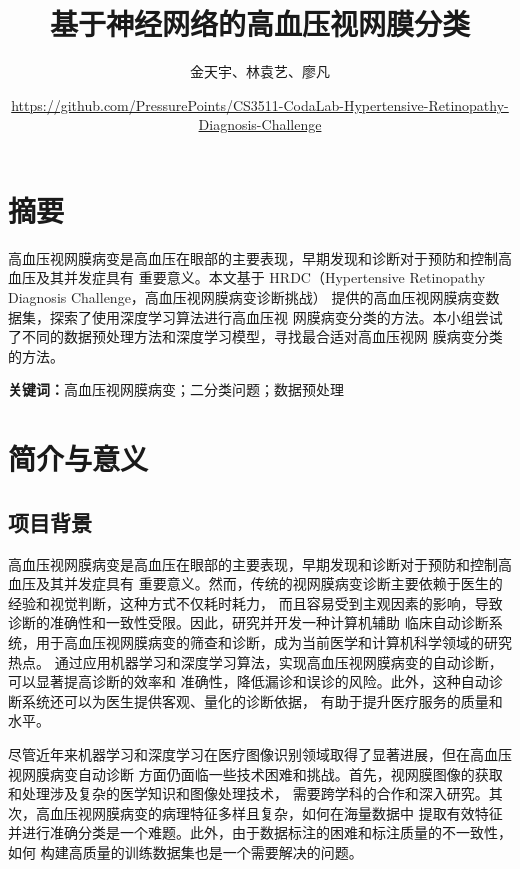 \documentclass[UTF8,12pt,a4paper]{ctexart}
\title{基于神经网络的高血压视网膜分类}
\author{金天宇、林袁艺、廖凡 }
\date{\footnotesize
\href{https://github.com/PressurePoints/CS3511-CodaLab-Hypertensive-Retinopathy-Diagnosis-Challenge}{https://github.com/PressurePoints/CS3511-CodaLab-Hypertensive-Retinopathy-Diagnosis-Challenge}
}
\begin{document}
\fancyfoot[C]{\thepage}

\maketitle


\section{摘要}
高血压视网膜病变是高血压在眼部的主要表现，早期发现和诊断对于预防和控制高血压及其并发症具有
重要意义。本文基于 HRDC（Hypertensive Retinopathy Diagnosis Challenge，高血压视网膜病变诊断挑战）
提供的高血压视网膜病变数据集，探索了使用深度学习算法进行高血压视
网膜病变分类的方法。本小组尝试了不同的数据预处理方法和深度学习模型，寻找最合适对高血压视网
膜病变分类的方法。

\textbf{关键词：}高血压视网膜病变；二分类问题；数据预处理

\section{简介与意义}
\subsection{项目背景}
高血压视网膜病变是高血压在眼部的主要表现，早期发现和诊断对于预防和控制高血压及其并发症具有
重要意义。然而，传统的视网膜病变诊断主要依赖于医生的经验和视觉判断，这种方式不仅耗时耗力，
而且容易受到主观因素的影响，导致诊断的准确性和一致性受限。因此，研究并开发一种计算机辅助
临床自动诊断系统，用于高血压视网膜病变的筛查和诊断，成为当前医学和计算机科学领域的研究热点。
通过应用机器学习和深度学习算法，实现高血压视网膜病变的自动诊断，可以显著提高诊断的效率和
准确性，降低漏诊和误诊的风险。此外，这种自动诊断系统还可以为医生提供客观、量化的诊断依据，
有助于提升医疗服务的质量和水平。

尽管近年来机器学习和深度学习在医疗图像识别领域取得了显著进展，但在高血压视网膜病变自动诊断
方面仍面临一些技术困难和挑战。首先，视网膜图像的获取和处理涉及复杂的医学知识和图像处理技术，
需要跨学科的合作和深入研究。其次，高血压视网膜病变的病理特征多样且复杂，如何在海量数据中
提取有效特征并进行准确分类是一个难题。此外，由于数据标注的困难和标注质量的不一致性，如何
构建高质量的训练数据集也是一个需要解决的问题。
\end{document}
